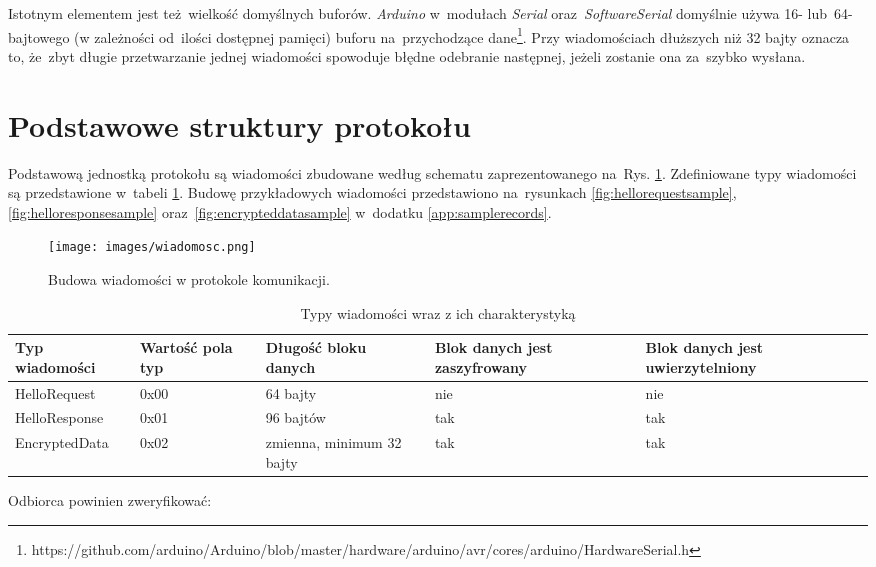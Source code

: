 Istotnym elementem jest też wielkość domyślnych buforów. \emph{Arduino} w~modułach \emph{Serial} oraz~\emph{SoftwareSerial} domyślnie używa 16- lub~64-bajtowego (w zależności od~ilości dostępnej pamięci) buforu na~przychodzące dane\footnote{https://github.com/arduino/Arduino/blob/master/hardware/arduino/avr/cores/arduino/HardwareSerial.h}. Przy wiadomościach dłuższych niż 32 bajty oznacza to, że~zbyt długie przetwarzanie jednej wiadomości spowoduje błędne odebranie następnej, jeżeli zostanie ona za~szybko wysłana.

\section{Podstawowe struktury protokołu}
\label{sec:proto}

Podstawową jednostką protokołu są wiadomości zbudowane według schematu zaprezentowanego na~Rys. \ref{fig:message-def}. Zdefiniowane typy wiadomości są przedstawione w~tabeli \ref{tab:recordtypes}. Budowę przykładowych wiadomości przedstawiono na~rysunkach \ref{fig:hellorequestsample}, \ref{fig:helloresponsesample} oraz~\ref{fig:encrypteddatasample} w~dodatku \ref{app:samplerecords}.

\FloatBarrier

\begin{figure}[h]
\centering
\texttt{[image: images/wiadomosc.png]}
\caption{Budowa wiadomości w protokole komunikacji.}
\label{fig:message-def}
\end{figure}

\begin{table}[h]
\centering
\caption{Typy wiadomości wraz z ich charakterystyką}
\begin{tabular}{|p{2.3cm}|p{1.4cm}|l|p{2.9cm}|p{3.1cm}|}
    \hline
    \textbf{Typ \mbox{wiadomości}}  &
    \textbf{Wartość pola typ}  &
    \textbf{Długość bloku danych}  &
    \textbf{Blok danych jest zaszyfrowany}  &
    \textbf{Blok danych jest uwierzytelniony}\\
    \hline
    HelloRequest & 0x00 & 64 bajty & nie & nie\\
    \hline
    HelloResponse & 0x01 & 96 bajtów & tak & tak\\
    \hline
    EncryptedData & 0x02 & zmienna, minimum 32 bajty & tak & tak\\
    \hline
\end{tabular}
\label{tab:recordtypes}
\end{table}

Odbiorca powinien zweryfikować:

